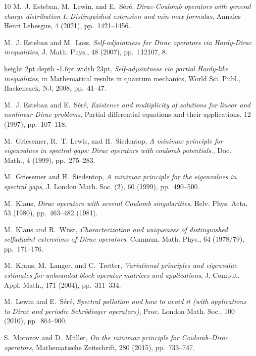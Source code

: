 \documentclass[12pt,reqno]{amsart}
\renewcommand{\(}{\left(}
\renewcommand{\)}{\right)}
\begin{document}
\begin{thebibliography}{10}
{\sc M.~J. Esteban, M.~Lewin, and E.~S\'{e}r\'{e}}, {\em Dirac-{C}oulomb
  operators with general charge distribution {I.} {Distinguished} extension and
  min-max formulas}, Annales Henri Lebesgue, 4 (2021), pp.~1421--1456.

{\sc M.~J. Esteban and M.~Loss}, {\em Self-adjointness for {D}irac operators
  via {H}ardy-{D}irac inequalities}, J. Math. Phys., 48 (2007), pp.~112107, 8.

\leavevmode\vrule height 2pt depth -1.6pt width 23pt, {\em Self-adjointness via
  partial {H}ardy-like inequalities}, in Mathematical results in quantum
  mechanics, World Sci. Publ., Hackensack, NJ, 2008, pp.~41--47.

{\sc M.~J. Esteban and E.~S{\'e}r{\'e}}, {\em Existence and multiplicity of
  solutions for linear and nonlinear {D}irac problems}, Partial differential
  equations and their applications, 12 (1997), pp.~107--118.

{\sc M.~Griesemer, R.~T. Lewis, and H.~Siedentop}, {\em A minimax principle for
  eigenvalues in spectral gaps: Dirac operators with coulomb potentials.}, Doc.
  Math., 4 (1999), pp.~275--283.

{\sc M.~Griesemer and H.~Siedentop}, {\em A minimax principle for the
  eigenvalues in spectral gaps}, J. London Math. Soc. (2), 60 (1999),
  pp.~490--500.

{\sc M.~Klaus}, {\em Dirac operators with several {C}oulomb singularities},
  Helv. Phys. Acta, 53 (1980), pp.~463--482 (1981).

{\sc M.~Klaus and R.~W{\"u}st}, {\em Characterization and uniqueness of
  distinguished selfadjoint extensions of {D}irac operators}, Commun. Math.
  Phys., 64 (1978/79), pp.~171--176.

{\sc M.~Kraus, M.~Langer, and C.~Tretter}, {\em Variational principles and
  eigenvalue estimates for unbounded block operator matrices and applications},
  J. Comput. Appl. Math., 171 (2004), pp.~311--334.

{\sc M.~Lewin and E.~S{\'e}r{\'e}}, {\em Spectral pollution and how to avoid it
  (with applications to {D}irac and periodic {S}chr{\"o}dinger operators)},
  Proc. London Math. Soc., 100 (2010), pp.~864--900.

{\sc S.~Morozov and D.~M{\"u}ller}, {\em On the minimax principle for
  {C}oulomb--{D}irac operators}, Mathematische Zeitschrift, 280 (2015),
  pp.~733--747.


\end{thebibliography}
\end{document}
